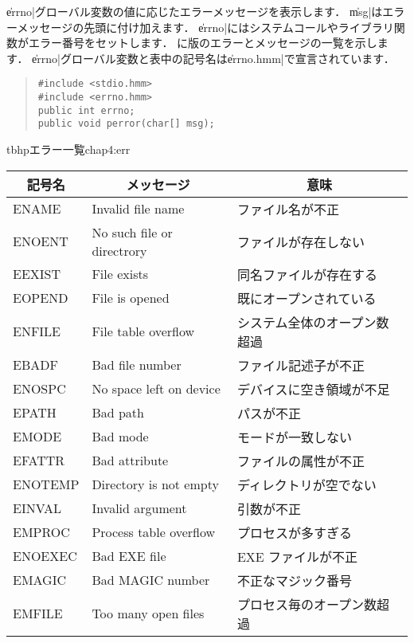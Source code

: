 \|errno|グローバル変数の値に応じたエラーメッセージを表示します．
\|msg|はエラーメッセージの先頭に付け加えます．
\|errno|にはシステムコールやライブラリ関数がエラー番号をセットします．
に{\tacos}版のエラーとメッセージの一覧を示します．
\|errno|グローバル変数と表中の記号名は\|errno.hmm|で宣言されています．

\begin{quote}
\begin{verbatim}
#include <stdio.hmm>
#include <errno.hmm>
public int errno;
public void perror(char[] msg);
\end{verbatim}
\end{quote}

\begin{mytable}{tbhp}{エラー一覧}{chap4:err}
\begin{tabular}{l|l|l}
\multicolumn{1}{c|}{記号名}
 & \multicolumn{1}{c|}{メッセージ}
 & \multicolumn{1}{c}{意味} \\\hline
ENAME     & Invalid file name           & ファイル名が不正 \\
ENOENT    & No such file or directrory  & ファイルが存在しない \\
EEXIST    & File exists                 & 同名ファイルが存在する \\
EOPEND    & File is opened              & 既にオープンされている \\
ENFILE    & File table overflow         & システム全体のオープン数超過 \\
EBADF     & Bad file number             & ファイル記述子が不正 \\
ENOSPC    & No space left on device     & デバイスに空き領域が不足 \\
EPATH     & Bad path                    & パスが不正 \\
EMODE     & Bad mode                    & モードが一致しない \\
EFATTR    & Bad attribute               & ファイルの属性が不正 \\
ENOTEMP   & Directory is not empty      & ディレクトリが空でない \\
EINVAL    & Invalid argument            & 引数が不正 \\
EMPROC    & Process table overflow      & プロセスが多すぎる \\
ENOEXEC   & Bad EXE file                & EXE ファイルが不正 \\
EMAGIC    & Bad MAGIC number            & 不正なマジック番号 \\
EMFILE    & Too many open files         & プロセス毎のオープン数超過 \\

\end{tabular}
\end{mytable}
